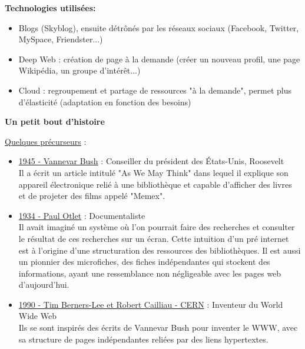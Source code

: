 \vspace{0.3cm}
\textbf{Technologies utilisées:}
    \begin{itemize}
        \item Blogs (Skyblog), ensuite détrônés par les réseaux sociaux (Facebook, Twitter, MySpace, Friendster...)
        \item Deep Web : création de page à la demande (créer un nouveau profil, une page Wikipédia, un groupe d'intérêt...)
        \item Cloud : regroupement et partage de ressources "à la demande", permet plus d'élasticité (adaptation en fonction des besoins)
    \end{itemize}

\vspace{0.5cm}       

\newpage

\vspace{0.5cm}
    \textbf{Un petit bout d'histoire}
    
    \vspace{0.3cm}
    
    \underline{Quelques précurseurs} :
    
    \begin{itemize}
        \item \underline{1945 - Vannevar Bush} : Conseiller du président des États-Unis, Roosevelt\\ 
        Il a écrit un article intitulé "As We May Think" dans lequel il explique son appareil électronique relié à une bibliothèque et capable d'afficher des livres et de projeter des films appelé "Memex".
        \item \underline{1934 - Paul Otlet} : Documentaliste\\ 
        Il avait imaginé un système où l'on pourrait faire des recherches et consulter le résultat de ces recherches sur un écran. Cette intuition d'un pré internet est à l'origine d'une structuration des ressources des bibliothèques. Il est aussi un pionnier des microfiches, des fiches indépendantes qui stockent des informations, ayant une ressemblance non négligeable avec les pages web d'aujourd'hui.
        \item \underline{1990 - Tim Berners-Lee et  Robert Cailliau - CERN} : Inventeur du World Wide Web\\
        Ils se sont inspirés des écrits de Vannevar Bush pour inventer le WWW, avec sa structure de pages indépendantes reliées par des liens hypertextes.
    \end{itemize}
    
